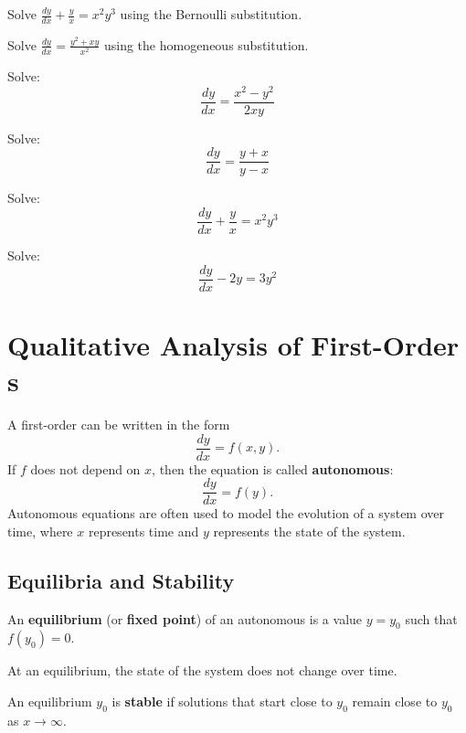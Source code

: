   \begin{question}
    Solve $\displaystyle \frac{dy}{dx} + \frac{y}{x} = x^2 y^3$ using the Bernoulli substitution.
  \end{question}

  \begin{question}
    Solve $\displaystyle \frac{dy}{dx} = \frac{y^2 + xy}{x^2}$ using the homogeneous substitution.
  \end{question}

  \begin{question}
    Solve:
    $$
    \frac{dy}{dx} = \frac{x^2 - y^2}{2xy}
    $$
  \end{question}

  \begin{question}
    Solve:
    $$
    \frac{dy}{dx} = \frac{y+x}{y-x}
    $$
  \end{question}

  \begin{question}
    Solve:
    $$
    \frac{dy}{dx} + \frac{y}{x} = x^2y^3
    $$
  \end{question}

  \begin{question}
    Solve:
    $$
    \frac{dy}{dx} - 2y = 3y^2
    $$
  \end{question}




\section{Qualitative Analysis of First-Order \ode{}s}
A first-order \ode{} can be written in the form
\[\frac{dy}{dx} = f(x,y).
\]
If \(f\) does not depend on \(x\), then the equation is called \textbf{autonomous}:
\[\frac{dy}{dx} = f(y).
\]
Autonomous equations are often used to model the evolution of a system over time, where \(x\) represents time and \(y\) represents the state of the system.
\subsection{Equilibria and Stability}
\begin{definition}
  An \textbf{equilibrium} (or \textbf{fixed point}) of an autonomous \ode{} is a value \(y = y_0\) such that \(f(y_0) = 0\).
\end{definition}
At an equilibrium, the state of the system does not change over time.


\begin{definition}
  An equilibrium \(y_0\) is \textbf{stable} if solutions that start close to \(y_0\) remain close to \(y_0\) as \(x \to \infty\).
\end{definition}

